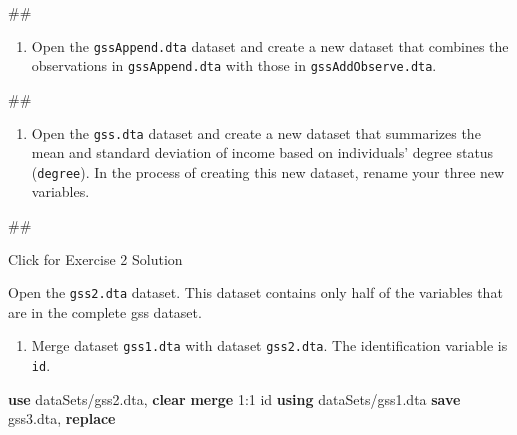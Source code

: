 \documentclass[
]{book}
\newenvironment{Shaded}{\begin{snugshade}}{\end{snugshade}}
\newcommand{\KeywordTok}[1]{\textcolor[rgb]{0.13,0.29,0.53}{\textbf{#1}}}
\newcommand{\NormalTok}[1]{#1}
\providecommand{\tightlist}{%
  \setlength{\itemsep}{0pt}\setlength{\parskip}{0pt}}
\begin{document}
\begin{Shaded}
\begin{Highlighting}[]
\NormalTok{\#\#}
\end{Highlighting}
\end{Shaded}

\begin{enumerate}
\def\labelenumi{\arabic{enumi}.}
\setcounter{enumi}{2}
\tightlist
\item
  Open the \texttt{gssAppend.dta} dataset and create a new dataset that combines the observations in \texttt{gssAppend.dta} with those in \texttt{gssAddObserve.dta}.
\end{enumerate}

\begin{Shaded}
\begin{Highlighting}[]
\NormalTok{\#\#}
\end{Highlighting}
\end{Shaded}

\begin{enumerate}
\def\labelenumi{\arabic{enumi}.}
\setcounter{enumi}{3}
\tightlist
\item
  Open the \texttt{gss.dta} dataset and create a new dataset that summarizes the mean and standard deviation of income based on individuals' degree status (\texttt{degree}). In the process of creating this new dataset, rename your three new variables.
\end{enumerate}

\begin{Shaded}
\begin{Highlighting}[]
\NormalTok{\#\#}
\end{Highlighting}
\end{Shaded}

{Click for Exercise 2 Solution}

Open the \texttt{gss2.dta} dataset. This dataset contains only half of the variables that are in the complete gss dataset.

\begin{enumerate}
\def\labelenumi{\arabic{enumi}.}
\tightlist
\item
  Merge dataset \texttt{gss1.dta} with dataset \texttt{gss2.dta}. The identification variable is \texttt{id}.
\end{enumerate}

\begin{Shaded}
\begin{Highlighting}[]
\KeywordTok{use}\NormalTok{ dataSets/gss2.dta, }\KeywordTok{clear}
\KeywordTok{merge}\NormalTok{ 1:1 id }\KeywordTok{using}\NormalTok{ dataSets/gss1.dta}
\KeywordTok{save}\NormalTok{ gss3.dta, }\KeywordTok{replace}
\end{Highlighting}
\end{Shaded}
\end{document}
